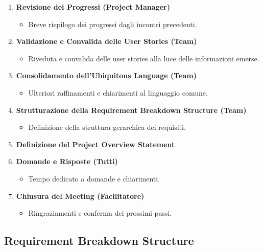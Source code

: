 \begin{enumerate}
    \item \textbf{Revisione dei Progressi (Project Manager)}
          \begin{itemize}
              \item Breve riepilogo dei progressi dagli incontri precedenti.
          \end{itemize}

    \item \textbf{Validazione e Convalida delle User Stories (Team)}
          \begin{itemize}
              \item Riveduta e convalida delle user stories alla luce delle informazioni emerse.
          \end{itemize}

    \item \textbf{Consolidamento dell'Ubiquitous Language (Team)}
          \begin{itemize}
              \item Ulteriori raffinamenti e chiarimenti al linguaggio comune.
          \end{itemize}

    \item \textbf{Strutturazione della Requirement Breakdown Structure (Team)}
          \begin{itemize}
              \item Definizione della struttura gerarchica dei requisiti.
          \end{itemize}

    \item \textbf{Definizione del Project Overview Statement}

    \item \textbf{Domande e Risposte (Tutti)}
          \begin{itemize}
              \item Tempo dedicato a domande e chiarimenti.
          \end{itemize}

    \item \textbf{Chiusura del Meeting (Facilitatore)}
          \begin{itemize}
              \item Ringraziamenti e conferma dei prossimi passi.
          \end{itemize}
\end{enumerate}

\subsection{Requirement Breakdown Structure}

